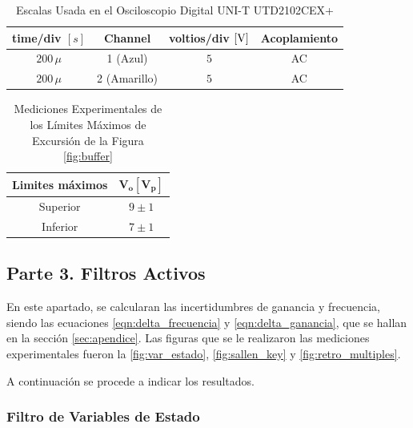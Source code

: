        \begin{table}[H]
            \centering
            \begin{tabular}{|c|c|c|c|}
                \hline
                \textbf{time/div} $[s]$ & \textbf{Channel} & \textbf{voltios/div $[\volt]$} & \textbf{Acoplamiento} \\ \hline
                $200 \, \mu$ & 1 (Azul) &  $5 $ & AC \\ \hline
                $200 \, \mu$ & 2 (Amarillo)  &   $5 $ & AC \\ \hline  
            \end{tabular}
            \caption{Escalas Usada en el Osciloscopio Digital UNI-T UTD2102CEX+}
            \label{tab:escala_exp_buffer_limites}
        \end{table}

        \begin{table}[H]
          \centering
          \begin{tabular}{|c|c|}
            \hline
            \textbf{Limites máximos} & $\mathbf{V_o [V_p]}$ \\
            \hline
            Superior & $9 \pm 1$ \\
            \hline
            Inferior & $7 \pm 1$ \\
            \hline
          \end{tabular}
          \caption{Mediciones Experimentales de los Límites Máximos de Excursión de la Figura \ref{fig:buffer}}
          \label{tab:exp_buffer_limites}
        \end{table}

    
\subsection{Parte 3. Filtros Activos}\label{subsec:parte3}

      En este apartado, se calcularan las incertidumbres de ganancia y frecuencia, siendo las ecuaciones \ref{eqn:delta_frecuencia} y \ref{eqn:delta_ganancia}, que se hallan en la sección \ref{sec:apendice}. Las figuras que se le realizaron las mediciones experimentales fueron la \ref{fig:var_estado}, \ref{fig:sallen_key} y \ref{fig:retro_multiples}. 
      
      A continuación se procede a indicar los resultados.

      \subsubsection{Filtro de Variables de Estado}

